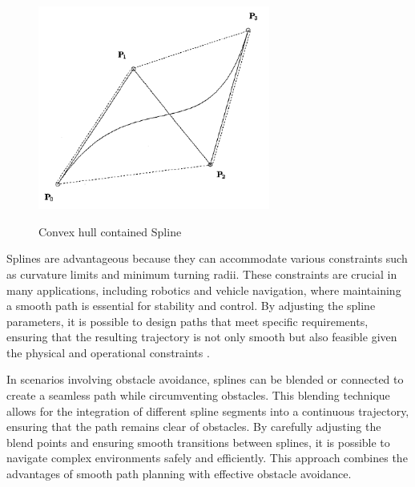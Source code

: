 \begin{figure}[H]
    \begin{center}
        \includegraphics[width=3in]{images/Chap2/convex-hull.png}\\
        \caption{Convex hull contained Spline \cite{R29}}
        \label{convex-hull}
    \end{center}
\end{figure}

Splines are advantageous because they can accommodate various constraints such as curvature limits 
and minimum turning radii. These constraints are crucial in many applications, including robotics 
and vehicle navigation, where maintaining a smooth path is essential for stability and control. 
By adjusting the spline parameters, it is possible to design paths that meet specific requirements, 
ensuring that the resulting trajectory is not only smooth but also feasible given the physical and 
operational constraints \cite{R30}.

In scenarios involving obstacle avoidance, splines can be blended or connected to create a seamless 
path while circumventing obstacles. This blending technique allows for the integration of different 
spline segments into a continuous trajectory, ensuring that the path remains clear of obstacles. 
By carefully adjusting the blend points and ensuring smooth transitions between splines, it is 
possible to navigate complex environments safely and efficiently. This approach combines the 
advantages of smooth path planning with effective obstacle avoidance.


